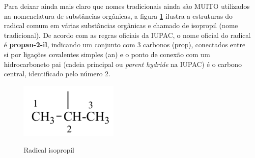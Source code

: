 Para deixar ainda mais claro que nomes tradicionais ainda são MUITO utilizados na nomenclatura de substâncias orgânicas, a figura \ref{fig:isopropil} ilustra a estruturas do radical comum em várias substâncias orgânicas e chamado de isopropil (nome tradicional). De acordo com as regras oficiais da IUPAC, o nome oficial do radical é \textbf{propan-2-il}, indicando um conjunto com 3 carbonos (prop), conectados entre si por ligações covalentes simples (an) e o ponto de conexão com um hidrocarboneto pai (cadeia principal ou \emph{parent hydride} na IUPAC) é o carbono central, identificado pelo número 2.
\begin{figure}[H]
	\centering
	\caption{Radical isopropil}
	\vspace{0.5cm}
	\includegraphics[width=0.25\linewidth]{imagens/isopropil.png}
	\label{fig:isopropil}
\end{figure}